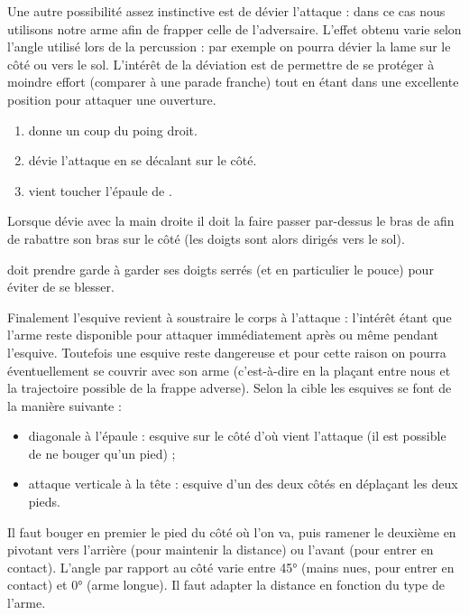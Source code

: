 Une autre possibilité assez instinctive est de dévier l'attaque : dans ce cas nous utilisons notre arme afin de frapper celle de l'adversaire.
L'effet obtenu varie selon l'angle utilisé lors de la percussion : par exemple on pourra dévier la lame sur le côté ou vers le sol.
L'intérêt de la déviation est de permettre de se protéger à moindre effort (comparer à une parade franche) tout en étant dans une excellente position pour attaquer une ouverture.


\begin{exercice}

\begin{enumerate}
	\item \A donne un coup du poing droit.
	
	\item \D dévie l'attaque en se décalant sur le côté.
	
	\item \D vient toucher l'épaule de \A.
\end{enumerate}

Lorsque \D dévie avec la main droite il doit la faire passer par-dessus le bras de \A afin de rabattre son bras sur le côté (les doigts sont alors dirigés vers le sol).

\D doit prendre garde à garder ses doigts serrés (et en particulier le pouce) pour éviter de se blesser.
\end{exercice}

Finalement l'esquive revient à soustraire le corps à l'attaque : l'intérêt étant que l'arme reste disponible pour attaquer immédiatement après ou même pendant l'esquive.
Toutefois une esquive reste dangereuse et pour cette raison on pourra éventuellement se couvrir avec son arme (c'est-à-dire en la plaçant entre nous et la trajectoire possible de la frappe adverse).
Selon la cible les esquives se font de la manière suivante :
\begin{itemize}
	\item diagonale à l'épaule : esquive sur le côté d'où vient l'attaque (il est possible de ne bouger qu'un pied) ;
	\item attaque verticale à la tête : esquive d'un des deux côtés en déplaçant les deux pieds.
\end{itemize}
Il faut bouger en premier le pied du côté où l'on va, puis ramener le deuxième en pivotant vers l'arrière (pour maintenir la distance) ou l'avant (pour entrer en contact).
L'angle par rapport au côté varie entre \ang{45} (mains nues, pour entrer en contact) et \ang{0} (arme longue).
Il faut adapter la distance en fonction du type de l'arme.


